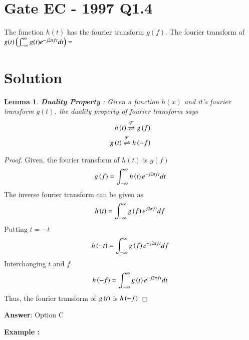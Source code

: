 \documentclass[journal,12pt,twocolumn]{IEEEtran}
\newtheorem{lemma}[theorem]{Lemma}
\begin{document}
\section*{Gate EC - 1997 Q1.4}
The function $h(t)$ has the fourier transform $g(f)$. The fourier transform of $g(t) \left( \int_{-\infty}^{\infty} g(t) e^{-j2\pi f t} dt\right) = $
\section*{Solution}
\begin{lemma}
\textbf{Duality Property} : Given a function $h(x)$ and it's fourier transform $g(t)$, the duality property of fourier transform says
\begin{align}
    h\left(t\right) \overset{\mathcal{F}}{ \rightleftharpoons}{g} \left(f\right)\\
    g\left(t\right) \overset{\mathcal{F}}{ \rightleftharpoons}{h} \left(-f\right)
\end{align}
\end{lemma}
\begin{proof}
Given, the fourier transform of $h(t)$ is $g(f)$
\begin{align}
    g\left(f\right) = \int_{-\infty}^{\infty} h\left(t\right) e^{-j2\pi ft} dt
\end{align}
The inverse fourier transform can be given as
\begin{align}
    h\left(t\right) = \int_{-\infty}^{\infty} g\left(f\right) e^{j2\pi ft} df
\end{align}
Putting $t = -t$
\begin{align}
    h\left(-t\right) = \int_{-\infty}^{\infty} g\left(f\right) e^{-j2\pi ft} df
\end{align}
Interchanging $t$ and $f$
\begin{align}
    h\left(-f\right) = \int_{-\infty}^{\infty} g\left(t\right) e^{-j2\pi f t} dt
\end{align}
Thus, the fourier transform of $g\left(t\right)$ is $h\left(-f\right)$
\end{proof}
\textbf{Answer}: Option C

\textbf{Example :}
\end{document}
